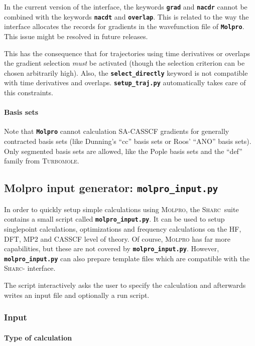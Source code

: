 \documentclass[a4paper,11pt,DIV=15,openany,twoside=false]{scrbook}
\newcommand{\sharc}{\textsc{Sharc}}
\newcommand{\ttt}[1]{\textbf{\texttt{#1}}}
\begin{document}
In the current version of the interface, the keywords \ttt{grad} and \ttt{nacdr} cannot be combined with the keywords \ttt{nacdt} and \ttt{overlap}. This is related to the way the interface allocates the records for gradients in the wavefunction file of \ttt{Molpro}. This issue might be resolved in future releases.

This has the consequence that for trajectories using time derivatives or overlaps the gradient selection \textit{must} be activated (though the selection criterion can be chosen arbitrarily high). Also, the \ttt{select\_directly} keyword is not compatible with time derivatives and overlaps. \ttt{setup\_traj.py} automatically takes care of this constraints.

\paragraph{Basis sets}

Note that \ttt{Molpro} cannot calculation SA-CASSCF gradients for generally contracted basis sets (like Dunning's ``cc'' basis sets or Roos' ``ANO'' basis sets). Only segmented basis sets are allowed, like the Pople basis sets and the ``def'' family from \textsc{Turbomole}.

\subsection{Molpro input generator: \ttt{molpro\_input.py}}\label{sec:molpro_input.py}

In order to quickly setup simple calculations using \textsc{Molpro}, the \sharc\ suite contains a small script called \ttt{molpro\_input.py}. It can be used to setup singlepoint calculations, optimizations and frequency calculations on the HF, DFT, MP2 and CASSCF level of theory. Of course, \textsc{Molpro} has far more capabilities, but these are not covered by \ttt{molpro\_input.py}. However, \ttt{molpro\_input.py} can also prepare template files which are compatible with the \sharc- interface.

The script interactively asks the user to specify the calculation and afterwards writes an input file and optionally a run script.

\subsubsection{Input}

\paragraph{Type of calculation}
\end{document}

